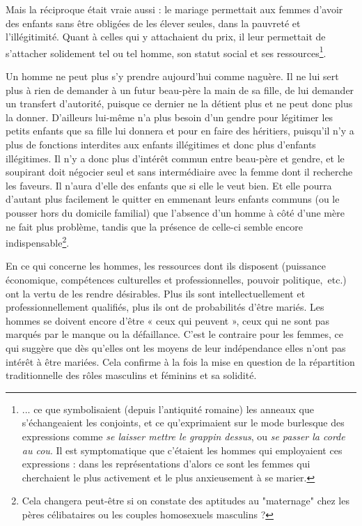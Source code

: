  Mais la réciproque était vraie aussi : le mariage permettait aux femmes d'avoir des enfants sans être obligées de les élever seules, dans la pauvreté et l'illégitimité. Quant à celles qui y attachaient du prix, il leur permettait de s'attacher solidement tel ou tel homme, son statut social et ses ressources\footnote{... ce que symbolisaient (depuis l'antiquité romaine) les anneaux que s'échangeaient les conjoints, et ce qu'exprimaient sur le mode burlesque des expressions comme {\emph{se laisser mettre le grappin dessus}}, ou {\emph{se passer la corde au cou}}. Il est symptomatique que c'étaient les hommes qui employaient ces expressions : dans les représentations d'alors ce sont les femmes qui cherchaient le plus activement et le plus anxieusement à se marier.}.
 
Un homme ne peut plus s'y prendre aujourd'hui comme naguère. Il ne lui sert plus à rien de demander à un futur beau-père la main de sa fille, de lui demander un transfert d'autorité, puisque ce dernier ne la détient plus et ne peut donc plus la donner. D'ailleurs lui-même n'a plus besoin d'un gendre pour légitimer les petits enfants que sa fille lui donnera et pour en faire des héritiers, puisqu'il n'y a plus de fonctions interdites aux enfants illégitimes et donc plus d'enfants illégitimes. Il n'y a donc plus d'intérêt commun entre beau-père et gendre, et le soupirant doit négocier seul et sans intermédiaire avec la femme dont il recherche les faveurs. Il n'aura d'elle des enfants que si elle le veut bien. Et elle pourra d'autant plus facilement le quitter en emmenant leurs enfants communs (ou le pousser hors du domicile familial) que l'absence d'un homme à côté d'une mère ne fait plus problème, tandis que la présence de celle-ci semble encore indispensable\footnote{Cela changera peut-être si on constate des aptitudes au "maternage" chez les pères célibataires ou les couples homosexuels masculins ?}. 
 
 En ce qui concerne les hommes, les ressources dont ils disposent (puissance économique, compétences culturelles et professionnelles, pouvoir politique,~etc.) ont la vertu de les rendre désirables. Plus ils sont intellectuellement et professionnellement qualifiés, plus ils ont de probabilités d'être mariés. Les hommes se doivent encore d'être « ceux qui peuvent », ceux qui ne sont pas marqués par le manque ou la défaillance.  C'est le contraire pour les femmes, ce qui suggère que dès qu'elles ont les moyens de leur indépendance elles n'ont pas intérêt à être mariées. Cela confirme à la fois la mise en question de la répartition traditionnelle des rôles masculins et féminins et sa solidité.
 
